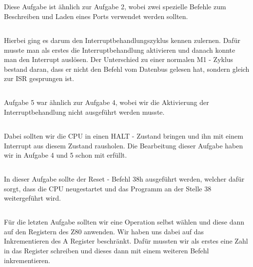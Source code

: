 \documentclass[a4paper,11pt]{article}
\begin{document}
\subsection{}
Diese Aufgabe ist ähnlich zur Aufgabe 2, wobei zwei spezielle Befehle zum Beschreiben und Laden eines Ports verwendet werden sollten.

\subsection{}
Hierbei ging es darum den Interruptbehandlungszyklus kennen zulernen. Dafür musste man als erstes die Interruptbehandlung aktivieren und danach konnte man den Interrupt auslösen. Der Unterschied zu einer normalen M1 - Zyklus bestand daran, dass er nicht den Befehl vom Datenbus gelesen hat, sondern gleich zur ISR gesprungen ist.

\subsection{}
Aufgabe 5 war ähnlich zur Aufgabe 4, wobei wir die Aktivierung der Interruptbehandlung nicht ausgeführt werden musste.

\subsection{}
Dabei sollten wir die CPU in einen HALT - Zustand bringen und ihn mit einem Interrupt aus diesem Zustand rausholen. Die Bearbeitung dieser Aufgabe haben wir in Aufgabe 4 und 5 schon mit erfüllt.

\subsection{}
In dieser Aufgabe sollte der Reset - Befehl 38h ausgeführt werden, welcher dafür sorgt, dass die CPU neugestartet und das Programm an der Stelle 38 weitergeführt wird.

\subsection{}
Für die letzten Aufgabe sollten wir eine Operation selbst wählen und diese dann auf den Registern des Z80 anwenden. Wir haben uns dabei auf das Inkrementieren des A Register beschränkt. Dafür mussten wir als erstes eine Zahl in das Register schreiben und dieses dann mit einem weiteren Befehl inkrementieren.
\end{document}
